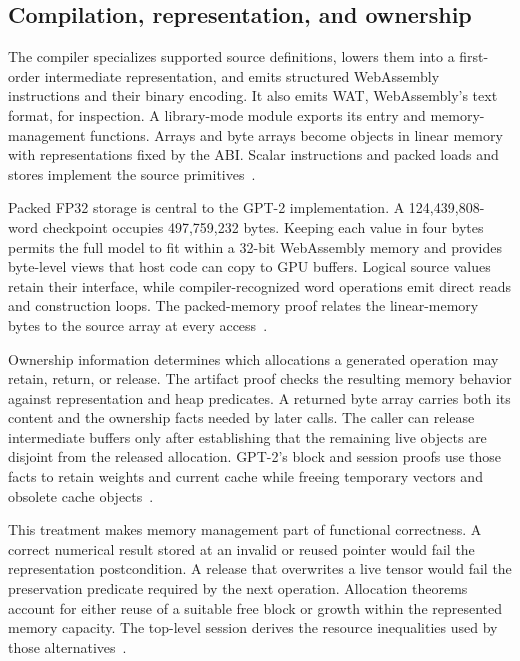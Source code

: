 \subsection{Compilation, representation, and ownership}

The compiler specializes supported source definitions, lowers them into a first-order intermediate representation, and emits structured WebAssembly instructions and their binary encoding.  It also emits WAT, WebAssembly's text format, for inspection.  A library-mode module exports its entry and memory-management functions.  Arrays and byte arrays become objects in linear memory with representations fixed by the ABI.  Scalar instructions and packed loads and stores implement the source primitives~\cite{language,compiler-implementation}.

Packed FP32 storage is central to the GPT-2 implementation.  A 124,439,808-word checkpoint occupies 497,759,232 bytes.  Keeping each value in four bytes permits the full model to fit within a 32-bit WebAssembly memory and provides byte-level views that host code can copy to GPU buffers.  Logical source values retain their  interface, while compiler-recognized word operations emit direct reads and construction loops.  The packed-memory proof relates the linear-memory bytes to the source array at every access~\cite{packed,manifest}.

Ownership information determines which allocations a generated operation may retain, return, or release.  The artifact proof checks the resulting memory behavior against representation and heap predicates.  A returned byte array carries both its content and the ownership facts needed by later calls.  The caller can release intermediate buffers only after establishing that the remaining live objects are disjoint from the released allocation.  GPT-2's block and session proofs use those facts to retain weights and current cache while freeing temporary vectors and obsolete cache objects~\cite{entry,budget,session}.

This treatment makes memory management part of functional correctness.  A correct numerical result stored at an invalid or reused pointer would fail the representation postcondition.  A release that overwrites a live tensor would fail the preservation predicate required by the next operation.  Allocation theorems account for either reuse of a suitable free block or growth within the represented memory capacity.  The top-level session derives the resource inequalities used by those alternatives~\cite{budget,input}.

